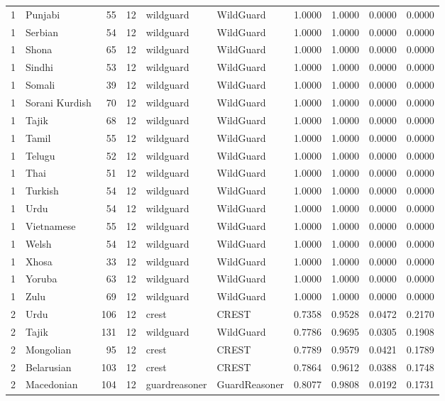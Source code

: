 \begin{tabular}{rlrrllrrrr}
1 & Punjabi & 55 & 12 & wildguard & WildGuard & 1.0000 & 1.0000 & 0.0000 & 0.0000 \\
1 & Serbian & 54 & 12 & wildguard & WildGuard & 1.0000 & 1.0000 & 0.0000 & 0.0000 \\
1 & Shona & 65 & 12 & wildguard & WildGuard & 1.0000 & 1.0000 & 0.0000 & 0.0000 \\
1 & Sindhi & 53 & 12 & wildguard & WildGuard & 1.0000 & 1.0000 & 0.0000 & 0.0000 \\
1 & Somali & 39 & 12 & wildguard & WildGuard & 1.0000 & 1.0000 & 0.0000 & 0.0000 \\
1 & Sorani Kurdish & 70 & 12 & wildguard & WildGuard & 1.0000 & 1.0000 & 0.0000 & 0.0000 \\
1 & Tajik & 68 & 12 & wildguard & WildGuard & 1.0000 & 1.0000 & 0.0000 & 0.0000 \\
1 & Tamil & 55 & 12 & wildguard & WildGuard & 1.0000 & 1.0000 & 0.0000 & 0.0000 \\
1 & Telugu & 52 & 12 & wildguard & WildGuard & 1.0000 & 1.0000 & 0.0000 & 0.0000 \\
1 & Thai & 51 & 12 & wildguard & WildGuard & 1.0000 & 1.0000 & 0.0000 & 0.0000 \\
1 & Turkish & 54 & 12 & wildguard & WildGuard & 1.0000 & 1.0000 & 0.0000 & 0.0000 \\
1 & Urdu & 54 & 12 & wildguard & WildGuard & 1.0000 & 1.0000 & 0.0000 & 0.0000 \\
1 & Vietnamese & 55 & 12 & wildguard & WildGuard & 1.0000 & 1.0000 & 0.0000 & 0.0000 \\
1 & Welsh & 54 & 12 & wildguard & WildGuard & 1.0000 & 1.0000 & 0.0000 & 0.0000 \\
1 & Xhosa & 33 & 12 & wildguard & WildGuard & 1.0000 & 1.0000 & 0.0000 & 0.0000 \\
1 & Yoruba & 63 & 12 & wildguard & WildGuard & 1.0000 & 1.0000 & 0.0000 & 0.0000 \\
1 & Zulu & 69 & 12 & wildguard & WildGuard & 1.0000 & 1.0000 & 0.0000 & 0.0000 \\
2 & Urdu & 106 & 12 & crest & CREST & 0.7358 & 0.9528 & 0.0472 & 0.2170 \\
2 & Tajik & 131 & 12 & wildguard & WildGuard & 0.7786 & 0.9695 & 0.0305 & 0.1908 \\
2 & Mongolian & 95 & 12 & crest & CREST & 0.7789 & 0.9579 & 0.0421 & 0.1789 \\
2 & Belarusian & 103 & 12 & crest & CREST & 0.7864 & 0.9612 & 0.0388 & 0.1748 \\
2 & Macedonian & 104 & 12 & guardreasoner & GuardReasoner & 0.8077 & 0.9808 & 0.0192 & 0.1731 \\

\end{tabular}
